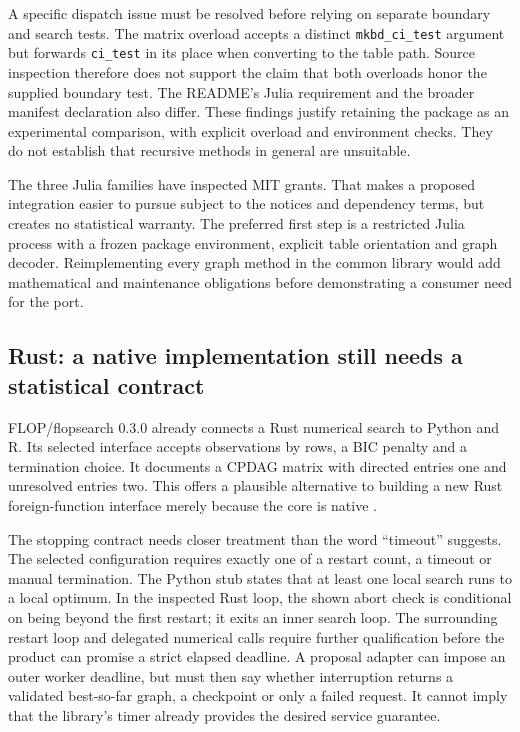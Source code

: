A specific dispatch issue must be resolved before relying on separate
boundary and search tests. The matrix overload accepts a distinct
\texttt{mkbd\_ci\_test} argument but forwards \texttt{ci\_test} in its place
when converting to the table path. Source inspection therefore does not
support the claim that both overloads honor the supplied boundary test.
The README's Julia requirement and the broader manifest declaration also
differ. These findings justify retaining the package as an experimental
comparison, with explicit overload and environment checks. They do not
establish that recursive methods in general are unsuitable.

The three Julia families have inspected MIT grants. That makes a proposed
integration easier to pursue subject to the notices and dependency terms,
but creates no statistical warranty. The preferred first step is a restricted
Julia process with a frozen package environment, explicit table orientation
and graph decoder. Reimplementing every graph method in the common library
would add mathematical and maintenance obligations before demonstrating a
consumer need for the port.

\subsection{Rust: a native implementation still needs a statistical contract}

FLOP/flopsearch 0.3.0 already connects a Rust numerical search to Python and R.
Its selected interface accepts observations by rows, a BIC penalty and a
termination choice. It documents a CPDAG matrix with directed entries one and
unresolved entries two. This offers a plausible alternative to building a
new Rust foreign-function interface merely because the core is native
\citep{exec13_other_flopsearch}.

The stopping contract needs closer treatment than the word ``timeout''
suggests. The selected configuration requires exactly one of a restart
count, a timeout or manual termination. The Python stub states that at least
one local search runs to a local optimum. In the inspected Rust loop, the
shown abort check is conditional on being beyond the first restart; it exits
an inner search loop. The surrounding restart loop and delegated numerical
calls require further qualification before the product can promise a strict
elapsed deadline. A proposal adapter can impose an outer worker deadline,
but must then say whether interruption returns a validated best-so-far
graph, a checkpoint or only a failed request. It cannot imply that the
library's timer already provides the desired service guarantee.


